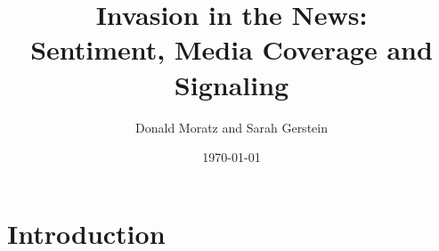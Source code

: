\documentclass[12pt]{article}
\title{%
  Invasion in the News: \\
  \large Sentiment, Media Coverage and Signaling}
\author{Donald Moratz and Sarah Gerstein}
\date{\today}
\begin{document}
\maketitle




\section*{Introduction}
\end{document}

